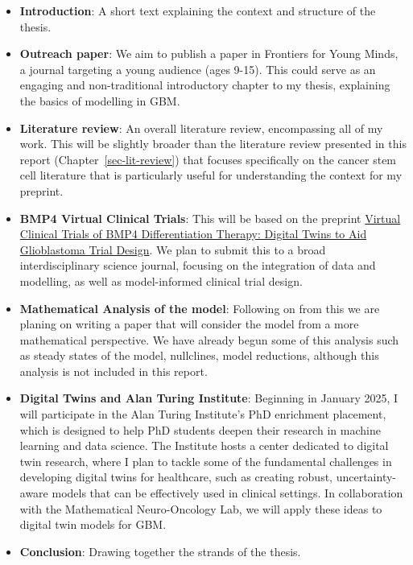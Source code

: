 \documentclass[
  letterpaper,
]{scrreprt}
\theoremstyle{definition}
\theoremstyle{remark}
\begin{document}
\begin{itemize}
\item
  \textbf{Introduction}: A short text explaining the context and
  structure of the thesis.
\item
  \textbf{Outreach paper}: We aim to publish a paper in Frontiers for
  Young Minds, a journal targeting a young audience (ages 9-15). This
  could serve as an engaging and non-traditional introductory chapter to
  my thesis, explaining the basics of modelling in GBM.
\item
  \textbf{Literature review}: An overall literature review, encompassing
  all of my work. This will be slightly broader than the literature
  review presented in this report (Chapter~\ref{sec-lit-review}) that
  focuses specifically on the cancer stem cell literature that is
  particularly useful for understanding the context for my preprint.
\item
  \textbf{BMP4 Virtual Clinical Trials}: This will be based on the
  preprint
  \href{https://www.biorxiv.org/content/10.1101/2024.08.22.609156v1.abstract}{Virtual
  Clinical Trials of BMP4 Differentiation Therapy: Digital Twins to Aid
  Glioblastoma Trial Design}. We plan to submit this to a broad
  interdisciplinary science journal, focusing on the integration of data
  and modelling, as well as model-informed clinical trial design.
\item
  \textbf{Mathematical Analysis of the model}: Following on from this we
  are planing on writing a paper that will consider the model from a
  more mathematical perspective. We have already begun some of this
  analysis such as steady states of the model, nullclines, model
  reductions, although this analysis is not included in this report.
\item
  \textbf{Digital Twins and Alan Turing Institute}: Beginning in January
  2025, I will participate in the Alan Turing Institute's PhD enrichment
  placement, which is designed to help PhD students deepen their
  research in machine learning and data science. The Institute hosts a
  center dedicated to digital twin research, where I plan to tackle some
  of the fundamental challenges in developing digital twins for
  healthcare, such as creating robust, uncertainty-aware models that can
  be effectively used in clinical settings. In collaboration with the
  Mathematical Neuro-Oncology Lab, we will apply these ideas to digital
  twin models for GBM.
\item
  \textbf{Conclusion}: Drawing together the strands of the thesis.
\end{itemize}
\end{document}
